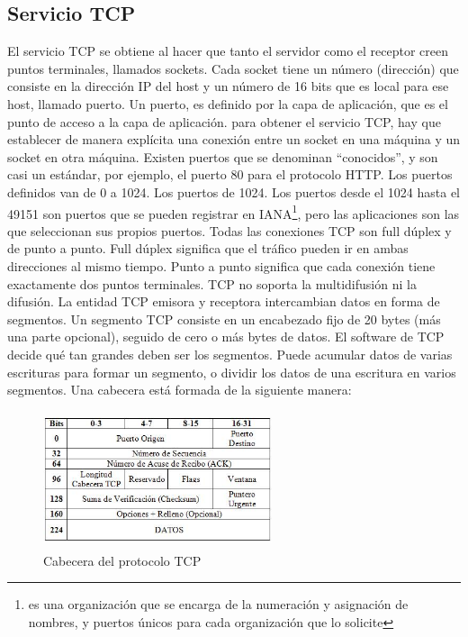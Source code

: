 \subsection{Servicio TCP}
	El servicio TCP se obtiene al hacer que tanto el servidor como el receptor creen puntos terminales, llamados sockets. Cada socket tiene un número (dirección) que consiste en la dirección IP del host y un número de 16 bits que es local para ese host, llamado puerto. Un puerto, es definido por la capa de aplicación, que es el punto de acceso a la capa de aplicación. para obtener el servicio TCP, hay que establecer de manera explícita una conexión entre un socket en una máquina y un socket en otra máquina. 
	Existen puertos que se denominan ``conocidos'', y son casi un estándar, por ejemplo, el puerto 80 para el protocolo HTTP. Los puertos definidos van de 0 a 1024. Los puertos de 1024. Los puertos desde el 1024 hasta el 49151 son puertos que se pueden registrar en IANA\footnote{es una organización que se encarga de la numeración y asignación de nombres, y puertos únicos para cada organización que lo solicite}, pero las aplicaciones son las que seleccionan sus propios puertos.  
	Todas las conexiones TCP son full dúplex y de punto a punto. Full dúplex significa que el tráfico pueden ir en ambas direcciones al mismo tiempo. Punto a punto significa que cada conexión tiene exactamente dos puntos terminales. TCP no soporta la multidifusión ni la difusión. 
	La entidad TCP emisora y receptora intercambian datos en forma de segmentos. Un segmento TCP consiste en un encabezado fijo de 20 bytes (más una parte opcional), seguido de cero o más bytes de datos. El software de TCP decide qué tan grandes deben ser los segmentos. Puede acumular datos de varias escrituras para formar un segmento, o dividir los datos de una escritura en varios segmentos. Una cabecera está formada de la siguiente manera: 
	\begin{figure}[ht]
		\centering 
		\includegraphics[height=4cm,width=0.6\textwidth]{parte_2/redes/cabecera-tcp} 
		\caption{Cabecera del protocolo TCP}
	\end{figure}

